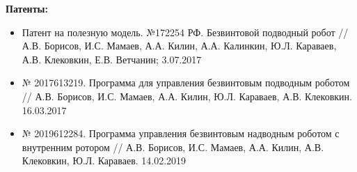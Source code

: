 \begin{frame}[shrink=25]
\textbf{Патенты:}
\begin{itemize}
		
	\item Патент на полезную модель. №172254 РФ. Безвинтовой подводный робот //  А.В. Борисов, И.С. Мамаев, А.А. Килин, А.А. Калинкин, Ю.Л. Караваев, А.В. Клековкин, Е.В. Ветчанин; %
	3.07.2017
		
	\item № 2017613219. Программа для управления безвинтовым подводным роботом // А.В. Борисов, И.С. Мамаев, А.А. Килин, Ю.Л. Караваев, А.В. Клековкин. %
	16.03.2017
		
	\item № 2019612284. Программа управления безвинтовым надводным роботом с внутренним ротором // А.В. Борисов, И.С. Мамаев, А.А. Килин, А.В. Клековкин, Ю.Л. Караваев. %
	14.02.2019
\end{itemize}

\end{frame}

